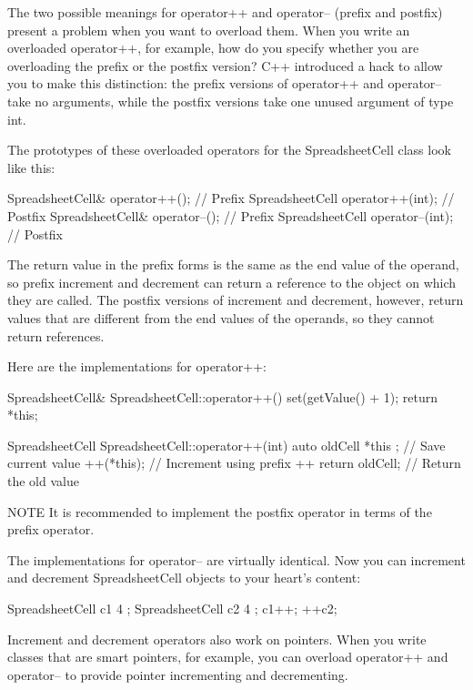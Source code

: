 The two possible meanings for operator++ and operator-- (prefix and postfix) present a problem when you want to overload them. When you write an overloaded operator++, for example, how do you specify whether you are overloading the prefix or the postfix version? C++ introduced a hack to allow you to make this distinction: the prefix versions of operator++ and operator-- take no arguments, while the postfix versions take one unused argument of type int.

The prototypes of these overloaded operators for the SpreadsheetCell class look like this:

\begin{cpp}
SpreadsheetCell& operator++(); // Prefix
SpreadsheetCell operator++(int); // Postfix
SpreadsheetCell& operator--(); // Prefix
SpreadsheetCell operator--(int); // Postfix
\end{cpp}

The return value in the prefix forms is the same as the end value of the operand, so prefix increment and decrement can return a reference to the object on which they are called. The postfix versions of increment and decrement, however, return values that are different from the end values of the operands, so they cannot return references.

Here are the implementations for operator++:

\begin{cpp}
SpreadsheetCell& SpreadsheetCell::operator++()
{
    set(getValue() + 1);
    return *this;
}

SpreadsheetCell SpreadsheetCell::operator++(int)
{
    auto oldCell { *this }; // Save current value
    ++(*this); // Increment using prefix ++
    return oldCell; // Return the old value
}
\end{cpp}

\begin{myNotic}{NOTE}
It is recommended to implement the postfix operator in terms of the prefix operator.
\end{myNotic}

The implementations for operator-- are virtually identical. Now you can increment and decrement SpreadsheetCell objects to your heart’s content:

\begin{cpp}
SpreadsheetCell c1 { 4 };
SpreadsheetCell c2 { 4 };
c1++;
++c2;
\end{cpp}

Increment and decrement operators also work on pointers. When you write classes that are smart pointers, for example, you can overload operator++ and operator-- to provide pointer incrementing and decrementing.



